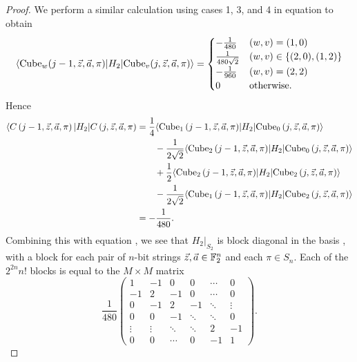 \documentclass[../thesis-main/thesis-main]{subfiles}
\begin{document}
\begin{proof}
We perform a similar calculation using cases 1, 3, and 4 in equation  to obtain
\begin{equation}
\langle{\operatorname{Cube}_{w}(j-1,\vec{z},\vec{a},\pi)}|H_{2}|{\operatorname{Cube}_{v}(j,\vec{z},\vec{a},\pi)}\rangle=\begin{cases}
-\frac{1}{480} & (w,v)=(1,0)\\
\frac{1}{480\sqrt{2}} & (w,v)\in\{(2,0),(1,2)\}\\
-\frac{1}{960} & (w,v)=(2,2)\\
0 & \text{otherwise.}
\end{cases}
\end{equation}
Hence 
\begin{align}
  \langle C\left(j-1,\vec{z},\vec{a},\pi\right)|H_{2}|C\left(j,\vec{z},\vec{a},\pi\right)& =\frac{1}{4}\langle{\operatorname{Cube}_{1}\left(j-1,\vec{z},\vec{a},\pi\right)}|H_{2}|{\operatorname{Cube}_{0}\left(j,\vec{z},\vec{a},\pi\right)}\rangle\nonumber\\
 &\qquad-\frac{1}{2\sqrt{2}}\langle{\operatorname{Cube}_{2}\left(j-1,\vec{z},\vec{a},\pi\right)}|H_{2}|{\operatorname{Cube}_{0}\left(j,\vec{z},\vec{a},\pi\right)}\rangle\nonumber\\
 &\qquad +\frac{1}{2}\langle{\operatorname{Cube}_{2}\left(j-1,\vec{z},\vec{a},\pi\right)}|H_{2}|{\operatorname{Cube}_{2}\left(j,\vec{z},\vec{a},\pi\right)}\rangle\nonumber\\
 &\qquad-\frac{1}{2\sqrt{2}}\langle{\operatorname{Cube}_{1}\left(j-1,\vec{z},\vec{a},\pi\right)}|H_{2}|{\operatorname{Cube}_{2}\left(j,\vec{z},\vec{a},\pi\right)}\rangle\\
 & =-\frac{1}{480}.
\end{align}
Combining this with equation , we see that $H_{2}|_{S_{2}}$ is block diagonal in the basis , with a block for each pair of $n$-bit strings $\vec{z},\vec{a}\in\mathbb{F}_2^{n}$ and each $\pi\in S_n$. Each of the $2^{2n}n!$ blocks is equal to the $M\times M$ matrix
\begin{equation}
  \frac{1}{480}
  \begin{pmatrix}
    1 & -1 & 0 & 0 & \cdots & 0  \\
    -1 & 2 & -1 & 0 & \cdots & 0  \\
    0 & -1 & 2 & -1 & \ddots & \vdots \\
    0 & 0 & -1 & \ddots & \ddots & 0 \\
    \vdots & \vdots & \ddots & \ddots & 2 & -1 \\
    0 & 0 & \cdots & 0 & -1 & 1  
  \end{pmatrix}.
\end{equation}

\end{proof}
\end{document}
